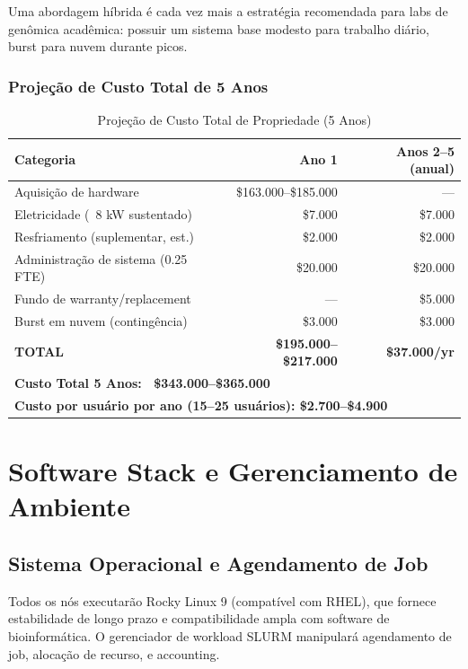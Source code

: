 Uma abordagem híbrida é cada vez mais a estratégia recomendada para labs de genômica acadêmica: possuir um sistema base modesto para trabalho diário, burst para nuvem durante picos.

\subsubsection{Projeção de Custo Total de 5 Anos}

\begin{table}[htbp]
\centering
\caption{Projeção de Custo Total de Propriedade (5 Anos)}
\begin{tabular}{lrr}
\hline
\textbf{Categoria} & \textbf{Ano 1} & \textbf{Anos 2--5 (anual)} \\
\hline
Aquisição de hardware & \$163.000--\$185.000 & --- \\
Eletricidade (~8 kW sustentado) & \$7.000 & \$7.000 \\
Resfriamento (suplementar, est.) & \$2.000 & \$2.000 \\
Administração de sistema (0.25 FTE) & \$20.000 & \$20.000 \\
Fundo de warranty/replacement & --- & \$5.000 \\
Burst em nuvem (contingência) & \$3.000 & \$3.000 \\
\hline
\textbf{TOTAL} & \textbf{\$195.000--\$217.000} & \textbf{\$37.000/yr} \\
\hline
\multicolumn{3}{l}{\textbf{Custo Total 5 Anos: ~\$343.000--\$365.000}} \\
\multicolumn{3}{l}{\textbf{Custo por usuário por ano (15--25 usuários): \$2.700--\$4.900}} \\
\hline
\end{tabular}
\end{table}

\section{Software Stack e Gerenciamento de Ambiente}

\subsection{Sistema Operacional e Agendamento de Job}

Todos os nós executarão Rocky Linux 9 (compatível com RHEL), que fornece estabilidade de longo prazo e compatibilidade ampla com software de bioinformática. O gerenciador de workload SLURM \parencite{slurm2023} manipulará agendamento de job, alocação de recurso, e accounting.

